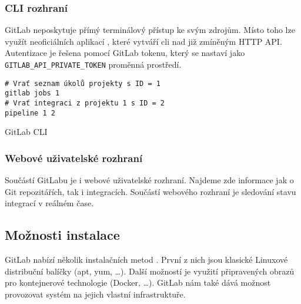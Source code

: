 \subsubsection{CLI rozhraní}

GitLab neposkytuje přímý terminálový přístup ke svým zdrojům.
Místo toho lze využít neoficiálních aplikací \cite{gitlab_cli}, které vytváří cli  nad již zmíněným HTTP API.
Autentizace je řešena pomocí GitLab tokenu, který se nastaví jako \verb|GITLAB_API_PRIVATE_TOKEN| proměnná prostředí.

\begin{listing}[ht]
\begin{verbatim}
# Vrať seznam úkolů projekty s ID = 1
gitlab jobs 1
# Vrať integraci z projektu 1 s ID = 2
pipeline 1 2
\end{verbatim}
\caption{\label{code:gitlab-api}GitLab CLI}
\end{listing}

\subsubsection{Webové uživatelské rozhraní}

Součástí GitLabu je i webové uživatelské rozhraní.
Najdeme zde informace jak o Git repozitářích, tak i integracích.
Součástí webového rozhraní je sledování stavu integrací v reálném čase.


\subsection{Možnosti instalace}

GitLab nabízí několik instalačních metod \cite{gitlab_install}.
První z nich jsou klasické Linuxové distribuční balíčky (apt, yum, \ldots).
Další možností je využití připravených obrazů pro kontejnerové technologie (Docker, \ldots).
GitLab nám také dává možnost provozovat systém na jejich vlastní infrastruktuře.

